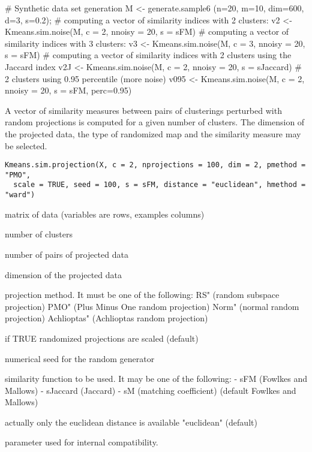 \documentclass{article}
\begin{document}
\begin{Examples}
\begin{ExampleCode}
# Synthetic data set generation
M <- generate.sample6 (n=20, m=10, dim=600, d=3, s=0.2);
# computing a vector of similarity indices with 2 clusters:
v2 <- Kmeans.sim.noise(M, c = 2, nnoisy = 20,  s = sFM)
# computing a vector of similarity indices with 3 clusters:
v3 <- Kmeans.sim.noise(M, c = 3, nnoisy = 20,  s = sFM)
# computing a vector of similarity indices with 2 clusters using the Jaccard index
v2J <- Kmeans.sim.noise(M, c = 2, nnoisy = 20,  s = sJaccard)
# 2 clusters using 0.95 percentile (more noise)
v095 <- Kmeans.sim.noise(M, c = 2, nnoisy = 20,  s = sFM, perc=0.95)
\end{ExampleCode}
\end{Examples}

\begin{Description}\relax
A vector of similarity measures between pairs of clusterings perturbed with random projections is computed for a given number of clusters. 
The dimension of the projected data, the type of randomized map and the similarity measure may be selected.
\end{Description}
\begin{Usage}
\begin{verbatim}
Kmeans.sim.projection(X, c = 2, nprojections = 100, dim = 2, pmethod = "PMO", 
  scale = TRUE, seed = 100, s = sFM, distance = "euclidean", hmethod = "ward")
\end{verbatim}
\end{Usage}
\begin{Arguments}
\begin{ldescription}
\item[\code{X}] matrix of data (variables are rows, examples columns) 
\item[\code{c}] number of clusters 
\item[\code{nprojections}] number of pairs of projected data 
\item[\code{dim}] dimension of the projected data 
\item[\code{pmethod}] projection method. It must be one of the following:  
RS" (random subspace projection)
PMO" (Plus Minus One random projection)
Norm" (normal random projection)
Achlioptas" (Achlioptas random projection)
\item[\code{scale}] if TRUE randomized projections are scaled (default) 
\item[\code{seed}] numerical seed for the random generator 
\item[\code{s}] similarity function to be used. It may be one of the following: 
- sFM (Fowlkes and Mallows)
- sJaccard (Jaccard)
- sM (matching coefficient)
(default Fowlkes and Mallows) 
\item[\code{distance}] actually only the euclidean distance is available "euclidean" (default) 
\item[\code{hmethod}] parameter used for internal compatibility. 
\end{ldescription}
\end{Arguments}
\end{document}
